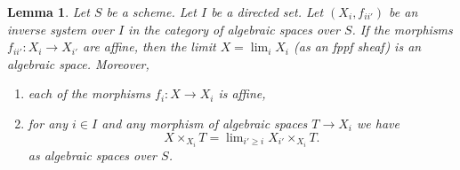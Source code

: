 \documentclass{amsart}
\theoremstyle{plain}
\newtheorem{lemma}[subsection]{Lemma}
\theoremstyle{definition}
\theoremstyle{remark}
\numberwithin{equation}{subsection}
\def\lim{\mathop{\mathrm{lim}}\nolimits}
\begin{document}
\begin{lemma}
\label{lemma-directed-inverse-system-has-limit}
Let $S$ be a scheme. Let $I$ be a directed set.
Let $(X_i, f_{ii'})$ be an inverse system over $I$
in the category of algebraic spaces over $S$.
If the morphisms $f_{ii'} : X_i \to X_{i'}$ are affine, then the
limit $X = \lim_i X_i$ (as an fppf sheaf) is an algebraic space.
Moreover,
\begin{enumerate}
\item each of the morphisms $f_i : X \to X_i$ is affine,
\item for any $i \in I$ and any morphism of algebraic spaces
$T \to X_i$ we have
$$
X \times_{X_i} T = \lim_{i' \geq i} X_{i'} \times_{X_i} T.
$$
as algebraic spaces over $S$.
\end{enumerate}
\end{lemma}
\end{document}
